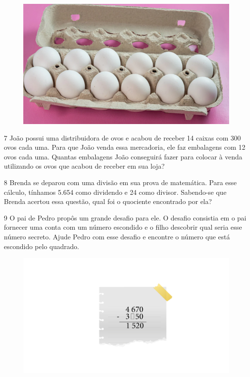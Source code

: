 \begin{figure}[htpb!]
\includegraphics[width=.5\textwidth]{./imgs/mat3.png}
\end{figure}

\num{7} João possui uma distribuidora de ovos e acabou de receber 14 caixas
com 300 ovos cada uma. Para que João venda essa mercadoria, ele faz
embalagens com 12 ovos cada uma. Quantas embalagens João conseguirá
fazer para colocar à venda utilizando os ovos que acabou de receber em
sua loja?




\num{8} Brenda se deparou com uma divisão em sua prova de matemática. Para
esse cálculo, tínhamos 5.654 como dividendo e 24 como divisor. Sabendo-se
que Brenda acertou essa questão, qual foi o quociente encontrado por ela?



\num{9} O pai de Pedro propôs um grande desafio para ele. O desafio
consistia em o pai fornecer uma conta com um número escondido e o filho descobrir qual seria esse número secreto. Ajude Pedro com esse
desafio e encontre o número que está escondido pelo quadrado.

\begin{figure}[htpb!]
\includegraphics[width=\textwidth]{../ilustracoes/MAT5/SAEB_5ANO_MAT_figura21.png}
\end{figure}

